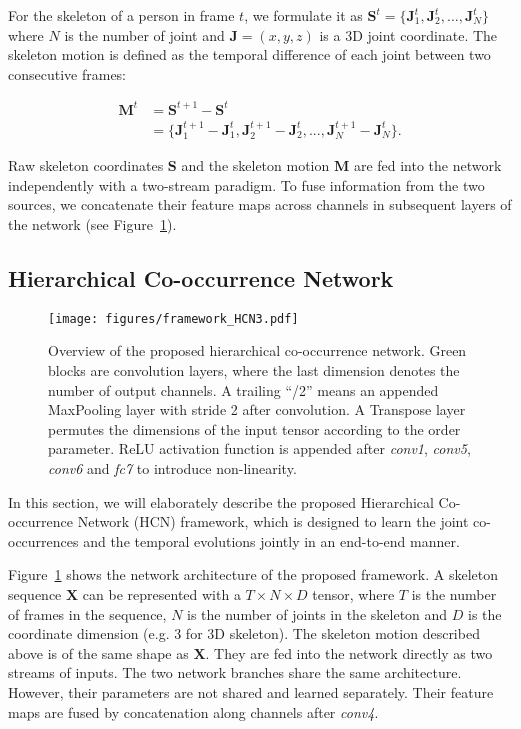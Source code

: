 \documentclass{article}
\begin{document}
For the skeleton of a person in frame $t$, we formulate it as $\bm{S}^t = \{\bm{J}_1^t, \bm{J}_2^t, \dots, \bm{J}_N^t\}$ where $N$ is the number of joint and $\bm{J} = (x,y,z)$ is a 3D joint coordinate. The skeleton motion is defined as the temporal difference of each joint between two consecutive frames:

\begin{align*}
  \bm{M}^t &= \bm{S}^{t+1}-\bm{S}^t \\
      &= \{\bm{J}_1^{t+1}-\bm{J}_1^t,\bm{J}_2^{t+1}-\bm{J}_2^t,...,\bm{J}_N^{t+1}-\bm{J}_N^t \}.
\end{align*}

Raw skeleton coordinates $\bm{S}$ and the skeleton motion $\bm{M}$ are fed into the network independently with a two-stream paradigm. To fuse information from the two sources, we concatenate their feature maps across channels in subsequent layers of the network (see Figure~\ref{fig:framework_HCN}).

\subsection{Hierarchical Co-occurrence Network}

\begin{figure}[tbp]
  \centering
  \texttt{[image: figures/framework\_HCN3.pdf]}
  \caption{Overview of the proposed hierarchical co-occurrence network. Green blocks are convolution layers, where the last dimension denotes the number of output channels. A trailing ``/2'' means an appended MaxPooling layer with stride 2 after convolution. A Transpose layer permutes the dimensions of the input tensor according to the order parameter. ReLU activation function is appended after \emph{conv1}, \emph{conv5}, \emph{conv6} and \emph{fc7} to introduce non-linearity.}
  \label{fig:framework_HCN}
\end{figure}

In this section, we will elaborately describe the proposed Hierarchical Co-occurrence Network (HCN) framework, which is designed to learn the joint co-occurrences and the temporal evolutions jointly in an end-to-end manner.

Figure~\ref{fig:framework_HCN} shows the network architecture of the proposed framework. A skeleton sequence $\bm{X}$ can be represented with a $T\times N\times D$ tensor, where $T$ is the number of frames in the sequence, $N$ is the number of joints in the skeleton and $D$ is the coordinate dimension (e.g. 3 for 3D skeleton). The skeleton motion described above is of the same shape as $\bm{X}$. They are fed into the network directly as two streams of inputs. The two network branches share the same architecture. However, their parameters are not shared and learned separately. Their feature maps are fused by concatenation along channels after \emph{conv4}.
\end{document}
